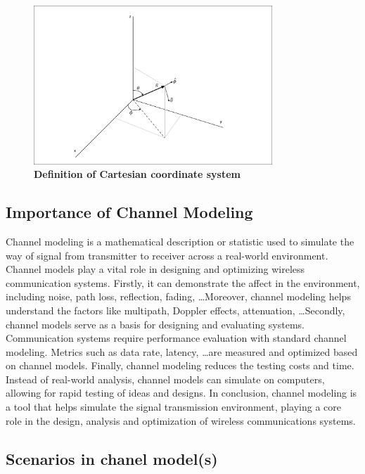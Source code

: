 \documentclass{article} %
\begin{document}
\begin{figure}[htbp]
    \centering
    \includegraphics[width=0.8\textwidth, clip, trim=5 5 5 5]{Figure 7.1.1.pdf}
    \caption[Definition of Cartesian coordinate system~\cite{ETSI5G}]{\bfseries \fontsize{12pt}{0pt}\selectfont Definition of Cartesian coordinate system~\cite{ETSI5G}}
    \label{coordinate}
\end{figure}

\subsection{Importance of Channel Modeling}
Channel modeling is a mathematical description or statistic used to simulate the way of signal from transmitter to receiver across a real-world environment. Channel models play a vital role in designing and optimizing wireless communication systems. Firstly, it can demonstrate the affect in the environment, including noise, path loss, reflection, fading, \dots Moreover, channel modeling helps understand the factors like multipath, Doppler effects, attenuation, \dots \space Secondly, channel models serve as a basis for designing and evaluating systems.  Communication systems require performance evaluation with standard channel modeling. Metrics such as data rate, latency, \dots are measured and optimized based on channel models. Finally, channel modeling reduces the testing costs and time. Instead of real-world analysis, channel models can simulate on computers, allowing for rapid testing of ideas and designs. In conclusion, channel modeling is a tool that helps simulate the signal transmission environment, playing a core role in the design, analysis and optimization of wireless communications systems.

\subsection{Scenarios in chanel model(s)}
\end{document}
